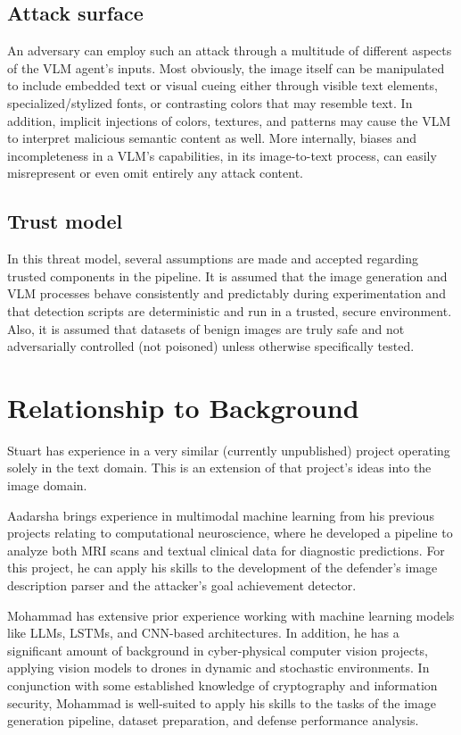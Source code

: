 \documentclass[10pt,twocolumn,letterpaper]{article}
\begin{document}
\subsection{Attack surface}
An adversary can employ such an attack through a multitude of different aspects of the VLM agent's inputs. Most obviously, the image itself can be manipulated to include embedded text or visual cueing either through visible text elements, specialized/stylized fonts, or contrasting colors that may resemble text. In addition, implicit injections of colors, textures, and patterns may cause the VLM to interpret malicious semantic content as well. More internally, biases and incompleteness in a VLM's capabilities, in its image-to-text process, can easily misrepresent or even omit entirely any attack content.

\subsection{Trust model}
In this threat model, several assumptions are made and accepted regarding trusted components in the pipeline. It is assumed that the image generation and VLM processes behave consistently and predictably during experimentation and that detection scripts are deterministic and run in a trusted, secure environment. Also, it is assumed that datasets of benign images are truly safe and not adversarially controlled (not poisoned) unless otherwise specifically tested.

\section{Relationship to Background}

Stuart has experience in a very similar (currently unpublished) project operating solely in the text domain.
This is an extension of that project's ideas into the image domain.

Aadarsha brings experience in multimodal machine learning from his previous projects relating to computational neuroscience, where he developed a pipeline to analyze both MRI scans and textual clinical data for diagnostic predictions. For this project, he can apply his skills to the development of the defender's image description parser and the attacker's goal achievement detector.

Mohammad has extensive prior experience working with machine learning models like LLMs, LSTMs, and CNN-based architectures. In addition, he has a significant amount of background in cyber-physical computer vision projects, applying vision models to drones in dynamic and stochastic environments. In conjunction with some established knowledge of cryptography and information security, Mohammad is well-suited to apply his skills to the tasks of the image generation pipeline, dataset preparation, and defense performance analysis.

    {\small
        
        
    }
\end{document}
